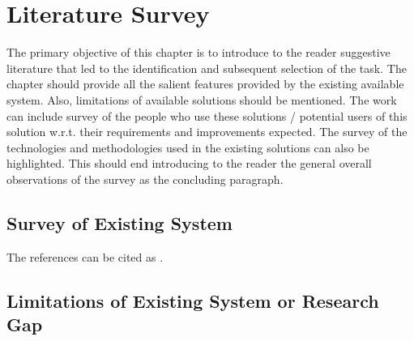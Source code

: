 \chapter{Literature Survey}
 The primary objective of this chapter is to introduce to the reader suggestive literature that
 led to the identification and subsequent selection of the task. The chapter should provide all
 the salient features provided by the existing available system. Also, limitations of available
 solutions should be mentioned. The work can include survey of the people who use these
 solutions / potential users of this solution w.r.t. their requirements and improvements expected.
 The survey of the technologies and methodologies used in the existing solutions can also be
 highlighted. This should end introducing to the reader the general overall observations of the
 survey as the concluding paragraph. \\


\section{Survey of Existing System}
The references can be cited as \cite{1}.
\section{Limitations of Existing System or Research Gap}

